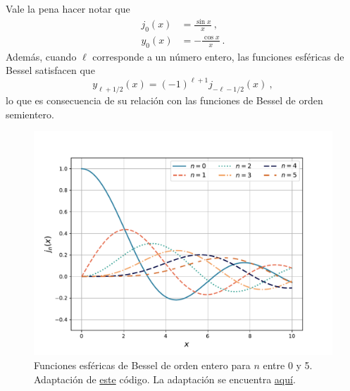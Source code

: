 Vale la pena hacer notar que
\begin{align}
    j_0(x) & = \frac{\sin x}{x} \ , \\
    y_0(x) & = - \frac{\cos x}{x} \ .
\end{align}
Además, cuando $\ell$ corresponde a un número entero, las funciones esféricas de Bessel satisfacen que
\begin{equation}
    y_{\ell+1/2}(x) = (-1)^{\ell+1} j_{-\ell - 1/2}(x) \ ,
\end{equation}
lo que es consecuencia de su relación con las funciones de Bessel de orden semientero.

\begin{figure}[htbp]
    \centering
    \includegraphics[width = 12cm]{Figuras/Bessel-Esferica-first-kind.pdf}
    \caption{Funciones esféricas de Bessel de orden entero para $n$ entre 0 y 5. Adaptación de \href{https://github.com/gfrubi/FM2/blob/master/figuras-editables/fig-Bessel.py}{este} código. La adaptación se encuentra \href{https://github.com/Pedroga-cc/Fisica-Matematica-II/blob/main/Figuras/Plotter_Bessel.py}{aquí}.}
    \label{fig:esferica_bessel_primera}
\end{figure}

